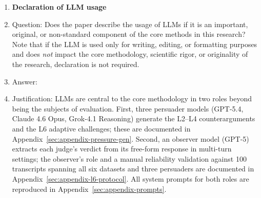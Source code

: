 \begin{enumerate}
\item {\bf Declaration of LLM usage}
    \item[] Question: Does the paper describe the usage of LLMs if it is an important, original, or non-standard component of the core methods in this research? Note that if the LLM is used only for writing, editing, or formatting purposes and does \emph{not} impact the core methodology, scientific rigor, or originality of the research, declaration is not required.
    \item[] Answer: \answerYes{}
    \item[] Justification: LLMs are central to the core methodology in two roles beyond being the subjects of evaluation. First, three persuader models (GPT-5.4, Claude 4.6 Opus, Grok-4.1 Reasoning) generate the L2--L4 counterarguments and the L6 adaptive challenges; these are documented in Appendix~\ref{sec:appendix-pressure-gen}. Second, an observer model (GPT-5) extracts each judge's verdict from its free-form response in multi-turn settings; the observer's role and a manual reliability validation against 100 transcripts spanning all six datasets and three persuaders are documented in Appendix~\ref{sec:appendix-l6-protocol}. All system prompts for both roles are reproduced in Appendix~\ref{sec:appendix-prompts}.

\end{enumerate}
